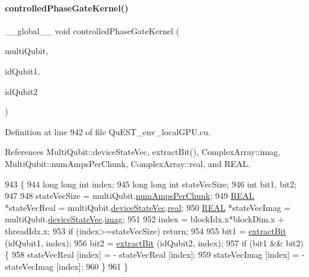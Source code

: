 \paragraph{\texorpdfstring{controlled\+Phase\+Gate\+Kernel()}{controlledPhaseGateKernel()}}
{\footnotesize\ttfamily \+\_\+\+\_\+global\+\_\+\+\_\+ void controlled\+Phase\+Gate\+Kernel (\begin{DoxyParamCaption}\item[{\mbox{\hyperlink{structMultiQubit}{Multi\+Qubit}}}]{multi\+Qubit,  }\item[{const int}]{id\+Qubit1,  }\item[{const int}]{id\+Qubit2 }\end{DoxyParamCaption})}



Definition at line 942 of file Qu\+E\+S\+T\+\_\+env\+\_\+local\+G\+P\+U.\+cu.



References Multi\+Qubit\+::device\+State\+Vec, extract\+Bit(), Complex\+Array\+::imag, Multi\+Qubit\+::num\+Amps\+Per\+Chunk, Complex\+Array\+::real, and R\+E\+AL.


\begin{DoxyCode}
943 \{
944     \textcolor{keywordtype}{long} \textcolor{keywordtype}{long} \textcolor{keywordtype}{int} index;
945     \textcolor{keywordtype}{long} \textcolor{keywordtype}{long} \textcolor{keywordtype}{int} stateVecSize;
946     \textcolor{keywordtype}{int} bit1, bit2;
947 
948     stateVecSize = multiQubit.\mbox{\hyperlink{structMultiQubit_a1cad83601a78635dd278259c7ed54f18}{numAmpsPerChunk}};
949     \mbox{\hyperlink{QuEST__precision_8h_a4b654506f18b8bfd61ad2a29a7e38c25}{REAL}} *stateVecReal = multiQubit.\mbox{\hyperlink{structMultiQubit_a59ac613486a41b8c9a4b6e79cc8d2cc3}{deviceStateVec}}.\mbox{\hyperlink{structComplexArray_a4195cac6c784ea1b6271f1c7dba1548a}{real}};
950     \mbox{\hyperlink{QuEST__precision_8h_a4b654506f18b8bfd61ad2a29a7e38c25}{REAL}} *stateVecImag = multiQubit.\mbox{\hyperlink{structMultiQubit_a59ac613486a41b8c9a4b6e79cc8d2cc3}{deviceStateVec}}.\mbox{\hyperlink{structComplexArray_a79dde47c7ae530c79cebfdf57b225968}{imag}};
951 
952     index = blockIdx.x*blockDim.x + threadIdx.x;
953     \textcolor{keywordflow}{if} (index>=stateVecSize) \textcolor{keywordflow}{return};
954 
955     bit1 = \mbox{\hyperlink{QuEST__env__localGPU_8cu_a6ffa51987d8ad8f6c0fc07fd3492277f}{extractBit}} (idQubit1, index);
956     bit2 = \mbox{\hyperlink{QuEST__env__localGPU_8cu_a6ffa51987d8ad8f6c0fc07fd3492277f}{extractBit}} (idQubit2, index);
957     \textcolor{keywordflow}{if} (bit1 && bit2) \{
958         stateVecReal [index] = - stateVecReal [index];
959         stateVecImag [index] = - stateVecImag [index];
960     \}
961 \}
\end{DoxyCode}
\mbox{\label{QuEST__env__localGPU_8cu_a8a701526263392599aa21d0d0f05d9d8}} 
